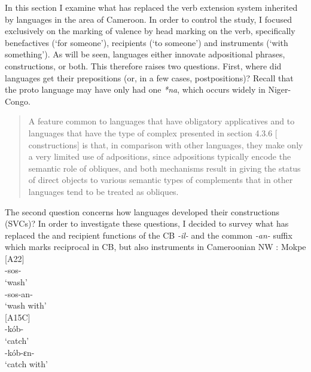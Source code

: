 \documentclass[output=paper]{langsci/langscibook}
\begin{document}
In this section I examine what has replaced the verb extension system inherited by languages in the  area of Cameroon. In order to control the study, I focused exclusively on the marking of valence by head marking on the verb, specifically benefactives (‘for someone’), recipients (‘to someone’) and instruments (‘with something’). As will be seen,  languages either innovate adpositional phrases,  constructions, or both. This therefore raises two questions. First, where did  languages get their prepositions (or, in a few cases, postpositions)? Recall that the proto language may have only had one  \textit{*na}, which occurs widely in Niger-Congo.
\begin{quote}
 A feature common to languages that have obligatory applicatives and to languages that have the type of complex  presented in section 4.3.6 [ constructions] is that, in comparison with other languages, they make only a very limited use of adpositions, since adpositions typically encode the semantic role of obliques, and both mechanisms result in giving the status of direct objects to various semantic types of complements that in other languages tend to be treated as obliques. \citep[124]{CreisselsEtAl2008}
\end{quote}
The second question concerns how  languages developed their  constructions (SVCs)? In order to investigate these questions, I decided to survey what has replaced the  and recipient functions of the CB  \textit{-il-} and the common \textit{-an-} suffix which marks reciprocal in CB, but also instruments in Cameroonian NW :
\ea
\label{ex:hyman:13}
\ea 
Mokpe [A22] \citep{Henson2001}\\
\gll -sos-\\
‘wash’\\
\gll -sos-an-\\
‘{wash with}’\\  
\ex 
{} [A15C] \citep[90]{Hedinger2008}\\
\gll -kób-\\
‘catch’\\
\gll -kób-ɛn-\\
‘{catch with}’ \\
  \z 
\z 
\end{document}
